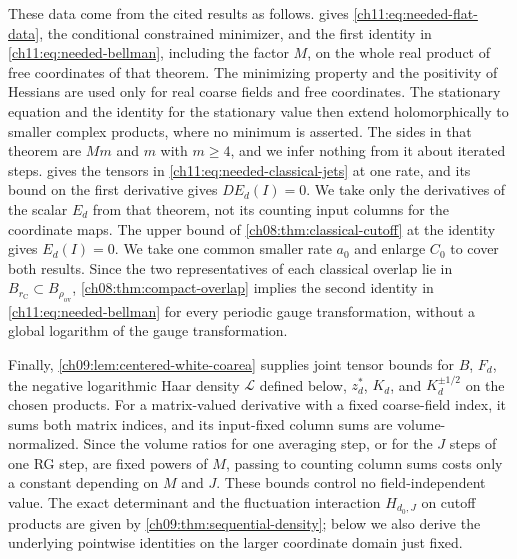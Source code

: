 These data come from the cited results as follows.  gives \eqref{ch11:eq:needed-flat-data}, the conditional constrained minimizer, and the first identity in \eqref{ch11:eq:needed-bellman}, including the factor $M$, on the whole real product of free coordinates of that theorem. The minimizing property and the positivity of Hessians are used only for real coarse fields and free coordinates. The stationary equation and the identity for the stationary value then extend holomorphically to smaller complex products, where no minimum is asserted. The sides in that theorem are $Mm$ and $m$ with $m\ge4$, and we infer nothing from it about iterated steps.  gives the tensors in \eqref{ch11:eq:needed-classical-jets} at one rate, and its bound on the first derivative gives $DE_d(I)=0$. We take only the derivatives of the scalar $E_d$ from that theorem, not its counting input columns for the coordinate maps. The upper bound of \cref{ch08:thm:classical-cutoff} at the identity gives $E_d(I)=0$. We take one common smaller rate $a_0$ and enlarge $C_0$ to cover both results. Since the two representatives of each classical overlap lie in $B_{r_{\mathrm C}}\subset B_{\rho_{\mathrm{ov}}}$, \cref{ch08:thm:compact-overlap} implies the second identity in \eqref{ch11:eq:needed-bellman} for every periodic gauge transformation, without a global logarithm of the gauge transformation.

Finally, \cref{ch09:lem:centered-white-coarea} supplies joint tensor bounds for $B$, $F_d$, the negative logarithmic Haar density $\mathcal L$ defined below, $z_d^*$, $K_d$, and $K_d^{\pm1/2}$ on the chosen products. For a matrix-valued derivative with a fixed coarse-field index, it sums both matrix indices, and its input-fixed column sums are volume-normalized. Since the volume ratios for one averaging step, or for the $J$ steps of one RG step, are fixed powers of $M$, passing to counting column sums costs only a constant depending on $M$ and $J$. These bounds control no field-independent value. The exact determinant and the fluctuation interaction $H_{d_0,J}$ on cutoff products are given by \cref{ch09:thm:sequential-density}; below we also derive the underlying pointwise identities on the larger coordinate domain just fixed.

